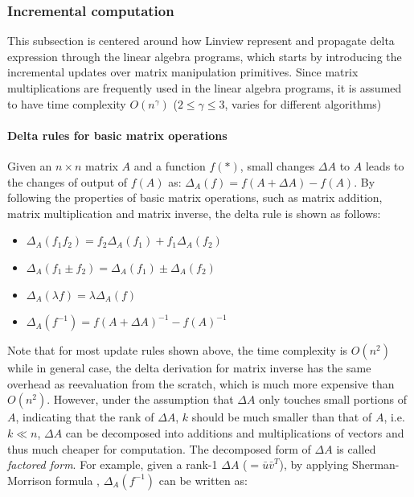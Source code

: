 \subsubsection{Incremental computation}
This subsection is centered around how Linview represent and propagate delta expression through the linear algebra programs, which starts by introducing the incremental updates over matrix manipulation primitives. Since matrix multiplications are frequently used in the linear algebra programs, it is assumed to have time complexity $O(n^{\gamma})$ ($2\leq \gamma \leq 3$, varies for different algorithms)

\paragraph{Delta rules for basic matrix operations}
Given an $n \times n$ matrix $A$ and a function $f(*)$, small changes $\Delta A$ to $A$ leads to the changes of output of $f(A)$ as: $\Delta_A(f) = f(A+\Delta A) - f(A)$. By following the properties of basic matrix operations, such as matrix addition, matrix multiplication and matrix inverse, the delta rule is shown as follows:

\begin{center}
    \begin{minipage}{0.4\textwidth}
      \begin{itemize}
        \item $\Delta_A(f_1 f_2) = f_2\Delta_A(f_1) + f_1\Delta_A(f_2)$
        \item $\Delta_A(f_1 \pm f_2) = \Delta_A(f_1) \pm \Delta_A(f_2)$
        \item $\Delta_A(\lambda f) = \lambda \Delta_A(f)$
        \item $\Delta_A(f^{-1}) = f(A+\Delta A)^{-1}-f(A)^{-1}$
      \end{itemize}
    \end{minipage}
  \end{center}

Note that for most update rules shown above, the time complexity is $O(n^2)$ while in general case, the delta derivation for matrix inverse has the same overhead as reevaluation from the scratch, which is much more expensive than $O(n^2)$. However, under the assumption that $\Delta A$ only touches small portions of $A$, indicating that the rank of $\Delta A$, $k$ should be much smaller than that of $A$, i.e. $k \ll n$, $\Delta A$ can be decomposed into additions and multiplications of vectors and thus much cheaper for computation. The decomposed form of $\Delta A$ is called {\em factored form}. For example, given a rank-1 $\Delta A$ ($=\bar{u}\bar{v}^T$), by applying Sherman-Morrison formula \cite{press2007numerical}, $\Delta_A(f^{-1})$ can be written as:

